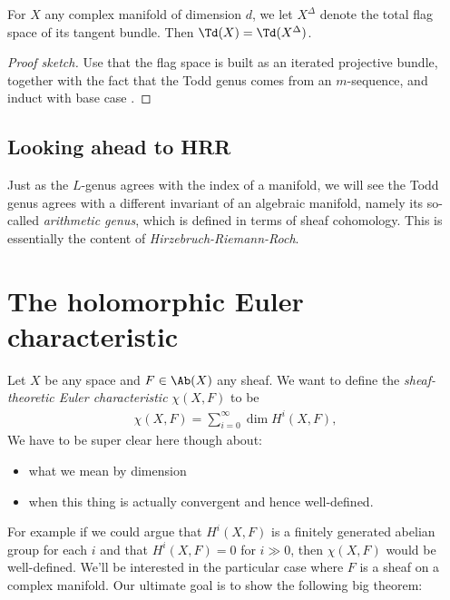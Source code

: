 \documentclass[11pt]{book}
\begin{document}
\begin{corollary} For $X$ any complex manifold of dimension $d$, we let $X^\Delta$ denote the total flag space of its tangent bundle. Then $\Td(X) = \Td(X^\Delta)$. 
\end{corollary}
\begin{proof}[Proof sketch] Use that the flag space is built as an iterated projective bundle, together with the fact that the Todd genus comes from an $m$-sequence, and induct with base case .
\end{proof}



\subsection{Looking ahead to HRR}

Just as the $L$-genus agrees with the index of a manifold, we will see the Todd genus agrees with a different invariant of an algebraic manifold, namely its so-called \emph{arithmetic genus}, which is defined in terms of sheaf cohomology. This is essentially the content of \emph{Hirzebruch-Riemann-Roch}.

\section{The holomorphic Euler characteristic}

\begin{definition}\label{def:sheaf-theoretic-Euler-char} 
Let $X$ be any space and $F\in \Ab(X)$ any sheaf. We want to define the \emph{sheaf-theoretic Euler characteristic} $\chi(X,F)$ to be
\begin{align*}
    \chi(X,F) = \sum_{i=0}^\infty \dim H^i(X,F),
\end{align*}
We have to be super clear here though about:
\begin{itemize}
    \item what we mean by dimension
    \item when this thing is actually convergent and hence well-defined.
\end{itemize}
\end{definition}

For example if we could argue that $H^i(X,F)$ is a finitely generated abelian group for each $i$ and that $H^i(X,F)=0$ for $i\gg0$, then $\chi(X,F)$ would be well-defined. We'll be interested in the particular case where $F$ is a sheaf on a complex manifold. Our ultimate goal is to show the following big theorem:
\end{document}
